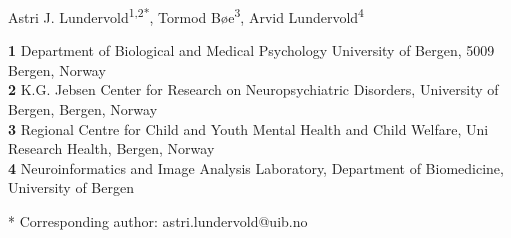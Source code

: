 \documentclass[10pt,letterpaper]{article}
\date{}
\begin{document}
\vspace*{0.2in}

\begin{flushleft}
{\Large
\textbf{} %
}
\newline

Astri J. Lundervold\textsuperscript{1,2*},
Tormod B\o{}e\textsuperscript{3},
Arvid Lundervold\textsuperscript{4}


\bigskip
\textbf{1} Department of Biological and Medical Psychology University of Bergen, 5009 Bergen, Norway
\\
\textbf{2} K.G. Jebsen Center for Research on Neuropsychiatric Disorders, University of Bergen, Bergen, Norway\\
\textbf{3} Regional Centre for Child and Youth Mental Health and Child Welfare, Uni Research Health, Bergen, Norway\\
\textbf{4} Neuroinformatics and Image Analysis Laboratory, Department of Biomedicine, University of Bergen
\\
\bigskip

% 
%





* Corresponding author: astri.lundervold@uib.no

\end{flushleft}
\end{document}
